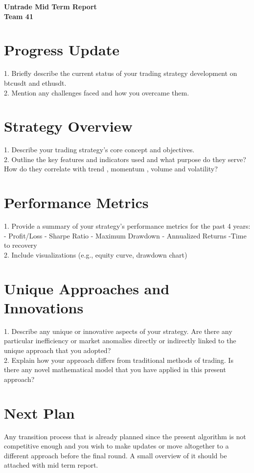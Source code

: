 \documentclass[12pt]{article}
\begin{document}
\begin{center}
    \Large \textbf{Untrade Mid Term Report} \\
    \normalsize \textbf{Team 41}
\end{center}

\section{Progress Update}
1. Briefly describe the current status of your trading strategy development on btcusdt and ethusdt.\\
2. Mention any challenges faced and how you overcame them.


\section{Strategy Overview}
1. Describe your trading strategy's core concept and objectives.\\ 
2. Outline the key features and indicators used and what purpose do they serve? How do they correlate with trend , momentum , volume and volatility?


\section{Performance Metrics}
 1. Provide a summary of your strategy's performance metrics for the past 4 years: - Profit/Loss - Sharpe Ratio - Maximum Drawdown - Annualized Returns -Time to recovery\\ 
 2. Include visualizations (e.g., equity curve, drawdown chart)



\section{Unique Approaches and Innovations}
1. Describe any unique or innovative aspects of your strategy. Are there any particular inefficiency or market anomalies directly or indirectly linked to the unique approach that you adopted? \\
2. Explain how your approach differs from traditional methods of trading. Is there any novel mathematical model that you have applied in this present approach? 

\section{Next Plan}
Any transition process that is already planned since the present algorithm is not competitive enough and you wish to make updates or move altogether to a different approach before the final round. A small overview of it should be attached with mid term report. 
\end{document}
